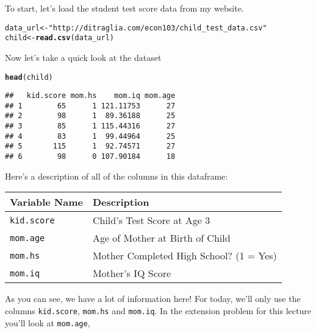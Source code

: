 \documentclass[12pt]{article}\usepackage[]{graphicx}\usepackage[]{color}
\makeatletter
\newcommand{\hlstr}[1]{\textcolor[rgb]{0.192,0.494,0.8}{#1}}%
\newcommand{\hlstd}[1]{\textcolor[rgb]{0.345,0.345,0.345}{#1}}%
\newcommand{\hlkwb}[1]{\textcolor[rgb]{0.69,0.353,0.396}{#1}}%
\newcommand{\hlkwd}[1]{\textcolor[rgb]{0.737,0.353,0.396}{\textbf{#1}}}%
\newenvironment{kframe}{%
 \def\at@end@of@kframe{}%
 \ifinner\ifhmode%
  \def\at@end@of@kframe{\end{minipage}}%
  \begin{minipage}{\columnwidth}%
 \fi\fi%
 \def\FrameCommand##1{\hskip\@totalleftmargin \hskip-\fboxsep
 \colorbox{shadecolor}{##1}\hskip-\fboxsep
     \hskip-\linewidth \hskip-\@totalleftmargin \hskip\columnwidth}%
 \MakeFramed {\advance\hsize-\width
   \@totalleftmargin\z@ \linewidth\hsize
   \@setminipage}}%
 {\par\unskip\endMakeFramed%
 \at@end@of@kframe}
\newenvironment{knitrout}{}{} %
\makeatother
\begin{document}
To start, let's load the student test score data from my website.
\begin{knitrout}
\color{fgcolor}\begin{kframe}
\begin{alltt}
\hlstd{data_url} \hlkwb{<-} \hlstr{"http://ditraglia.com/econ103/child_test_data.csv"}
\hlstd{child} \hlkwb{<-} \hlkwd{read.csv}\hlstd{(data_url)}
\end{alltt}
\end{kframe}
\end{knitrout}
Now let's take a quick look at the dataset
\begin{knitrout}
\color{fgcolor}\begin{kframe}
\begin{alltt}
\hlkwd{head}\hlstd{(child)}
\end{alltt}
\begin{verbatim}
##   kid.score mom.hs    mom.iq mom.age
## 1        65      1 121.11753      27
## 2        98      1  89.36188      25
## 3        85      1 115.44316      27
## 4        83      1  99.44964      25
## 5       115      1  92.74571      27
## 6        98      0 107.90184      18
\end{verbatim}
\end{kframe}
\end{knitrout}
Here's a description of all of the columns in this dataframe:
\begin{table}[h]
\centering
  \begin{tabular}{|ll|}
  \hline
		Variable Name & Description\\
		\hline
		\texttt{kid.score}& Child's Test Score at Age 3\\
		\texttt{mom.age}&Age of Mother at Birth of Child\\
		\texttt{mom.hs}& Mother Completed High School? (1 = Yes)\\
		\texttt{mom.iq}& Mother's IQ Score\\
    \hline
	\end{tabular}
\end{table}
As you can see, we have a lot of information here! 
For today, we'll only use the columns \texttt{kid.score}, \texttt{mom.hs} and \texttt{mom.iq}.
In the extension problem for this lecture you'll look at \texttt{mom.age},
\end{document}
